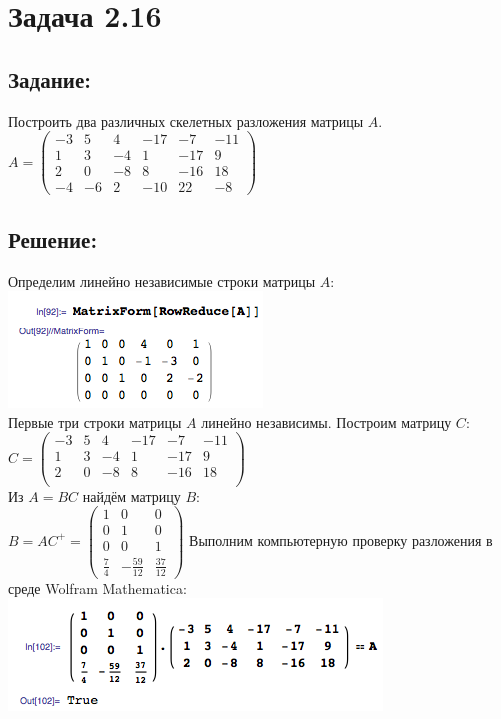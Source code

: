 \section{Задача 2.16}
\subsection{Задание:}
Построить два различных скелетных разложения матрицы $ A $.
\\[1em]
$
	A = \begin{pmatrix}
		-3 & 5 & 4 & -17 & -7 & -11 \\
		1 & 3 & -4 & 1 & -17 & 9 \\
		2 & 0 & -8 & 8 & -16 & 18 \\
		-4 & -6 & 2 & -10 & 22 & -8
	\end{pmatrix}
$
\subsection{Решение:}
Определим линейно независимые строки матрицы $ A $:
\\
\includegraphics[scale=0.6]{task/2_16/screen1.png}
\\
Первые три строки матрицы $ A $ линейно независимы. Построим матрицу $ C $:
\\[1em]
$
	C =
	\begin{pmatrix}
		-3 & 5 & 4 & -17 & -7 & -11 \\
		1 & 3 & -4 & 1 & -17 & 9 \\
		2 & 0 & -8 & 8 & -16 & 18 \\
	\end{pmatrix}
$
\\[1em]
Из $ A = BC $ найдём матрицу $ B $:
\\[1em]
$
	B = AC^{+} =
	\begin{pmatrix}
		1 & 0 & 0 \\
		0 & 1 & 0 \\
		0 & 0 & 1 \\
		\frac{7}{4} & -\frac{59}{12} & \frac{37}{12}
	\end{pmatrix}
$
Выполним компьютерную проверку разложения в среде Wolfram Mathematica:
\\
\includegraphics[scale=0.6]{task/2_16/screen2.png}
